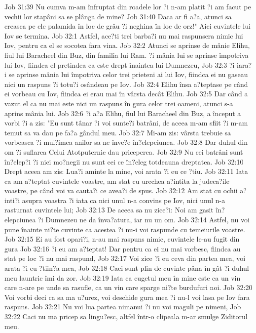 Job 31:39  Nu cumva m-am înfruptat din roadele lor ?i n-am platit ?i am facut pe vechii lor stapâni sa se plânga de mine?
Job 31:40  Daca ar fi a?a, atunci sa creasca pe ele palamida în loc de grâu ?i neghina în loc de orz!" Aici cuvintele lui Iov se termina.
Job 32:1  Astfel, ace?ti trei barba?i nu mai raspunsera nimic lui Iov, pentru ca el se socotea fara vina.
Job 32:2  Atunci se aprinse de mânie Elihu, fiul lui Baracheel din Buz, din familia lui Ram. ?i mânia lui se aprinse împotriva lui Iov, fiindca el pretindea ca este drept înaintea lui Dumnezeu,
Job 32:3  ?i iara?i se aprinse mânia lui împotriva celor trei prieteni ai lui Iov, fiindca ei nu gaseau nici un raspuns ?i totu?i osândeau pe Iov.
Job 32:4  Elihu însa a?teptase pe când ei vorbeau cu Iov, fiindca ei erau mai în vârsta decât Elihu.
Job 32:5  Dar când a vazut el ca nu mai este nici un raspuns în gura celor trei oameni, atunci s-a aprins mânia lui.
Job 32:6  ?i a?a Elihu, fiul lui Baracheel din Buz, a început a vorbi ?i a zis: "Eu sunt tânar ?i voi sunte?i batrâni, de aceea m-am sfiit ?i m-am temut sa va dau pe fa?a gândul meu.
Job 32:7  Mi-am zis: vârsta trebuie sa vorbeasca ?i mul?imea anilor sa ne înve?e în?elepciunea.
Job 32:8  Dar duhul din om ?i suflarea Celui Atotputernic dau priceperea.
Job 32:9  Nu cei batrâni sunt în?elep?i ?i nici mo?negii nu sunt cei ce în?eleg totdeauna dreptatea.
Job 32:10  Drept aceea am zis: Lua?i aminte la mine, voi arata ?i eu ce ?tiu.
Job 32:11  Iata ca am a?teptat cuvintele voastre, am stat cu urechea a?intita la judeca?ile voastre, pe când voi va cauta?i ce avea?i de spus.
Job 32:12  Am stat cu ochii a?inti?i asupra voastra ?i iata ca nici unul n-a convins pe Iov, nici unul n-a rasturnat cuvintele lui;
Job 32:13  De aceea sa nu zice?i: Noi am gasit în?elepciunea ?i Dumnezeu ne da înva?atura, iar nu un om.
Job 32:14  Astfel, nu voi pune înainte ni?te cuvinte ca acestea ?i nu-i voi raspunde cu temeiurile voastre.
Job 32:15  Ei au fost opari?i, n-au mai raspuns nimic, cuvintele le-au fugit din gura
Job 32:16  ?i eu am a?teptat! Dar pentru ca ei nu mai vorbesc, fiindca au stat pe loc ?i nu mai raspund,
Job 32:17  Voi zice ?i eu ceva din partea mea, voi arata ?i eu ?tiin?a mea,
Job 32:18  Caci sunt plin de cuvinte pâna în gât ?i duhul meu launtric îmi da zor.
Job 32:19  Iata ca cugetul meu în mine este ca un vin care n-are pe unde sa rasufle, ca un vin care sparge ni?te burdufuri noi.
Job 32:20  Voi vorbi deci ca sa ma u?urez, voi deschide gura mea ?i nu-l voi lasa pe Iov fara raspuns.
Job 32:21  Nu voi lua partea nimanui ?i nu voi maguli pe nimeni,
Job 32:22  Caci nu ma pricep sa lingu?esc, altfel într-o clipeala m-ar smulge Ziditorul meu.
